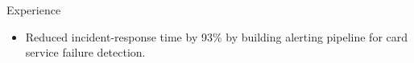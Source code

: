 \documentclass{resume} %
\begin{document}

\begin{workSection}{Experience}
	
	\experienceItem[
	company=Capital One,
	location=McLean{,} VA,
	position=Software Engineering Intern,
	duration= June 2025 - August 2025,
	]
	\begin{itemize}
		\vspace{-0.5em}
		\itemsep -6pt {}
		\item Reduced incident-response time by {93\%} by building alerting pipeline for card service failure detection.


\end{itemize}
\end{workSection}
\end{document}
